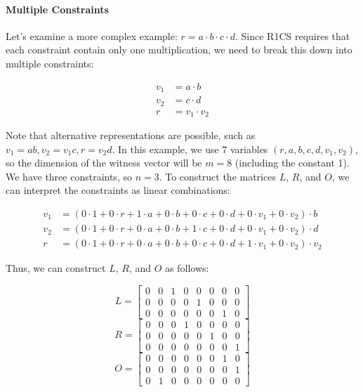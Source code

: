 \documentclass{article}
\begin{document}
\paragraph{Multiple Constraints}

Let's examine a more complex example: $r = a \cdot b \cdot c \cdot d$. Since R1CS requires that each constraint contain only one multiplication, we need to break this down into multiple constraints:

\begin{align*}
v_1 &= a \cdot b \\
v_2 &= c \cdot d \\
r &= v_1 \cdot v_2
\end{align*}

Note that alternative representations are possible, such as $v_1 = ab, v_2 = v_1c, r = v_2d$. In this example, we use 7 variables $(r, a, b, c, d, v_1, v_2)$, so the dimension of the witness vector will be $m = 8$ (including the constant 1). We have three constraints, so $n = 3$.
To construct the matrices $L$, $R$, and $O$, we can interpret the constraints as linear combinations:

\begin{align*}
v_1 &= (0 \cdot 1 + 0 \cdot r + 1 \cdot a + 0 \cdot b + 0 \cdot c + 0 \cdot d + 0 \cdot v_1 + 0 \cdot v_2) \cdot b \\
v_2 &= (0 \cdot 1 + 0 \cdot r + 0 \cdot a + 0 \cdot b + 1 \cdot c + 0 \cdot d + 0 \cdot v_1 + 0 \cdot v_2) \cdot d \\
r &= (0 \cdot 1 + 0 \cdot r + 0 \cdot a + 0 \cdot b + 0 \cdot c + 0 \cdot d + 1 \cdot v_1 + 0 \cdot v_2) \cdot v_2
\end{align*}

Thus, we can construct $L$, $R$, and $O$ as follows:

\begin{equation*}
L = \begin{bmatrix}
0 & 0 & 1 & 0 & 0 & 0 & 0 & 0 \\
0 & 0 & 0 & 0 & 1 & 0 & 0 & 0 \\
0 & 0 & 0 & 0 & 0 & 0 & 1 & 0
\end{bmatrix}
\end{equation*}
\begin{equation*}
R = \begin{bmatrix}
0 & 0 & 0 & 1 & 0 & 0 & 0 & 0 \\
0 & 0 & 0 & 0 & 0 & 1 & 0 & 0 \\
0 & 0 & 0 & 0 & 0 & 0 & 0 & 1
\end{bmatrix}
\end{equation*}
\begin{equation*}
O = \begin{bmatrix}
0 & 0 & 0 & 0 & 0 & 0 & 1 & 0 \\
0 & 0 & 0 & 0 & 0 & 0 & 0 & 1 \\
0 & 1 & 0 & 0 & 0 & 0 & 0 & 0
\end{bmatrix}
\end{equation*}
\end{document}
